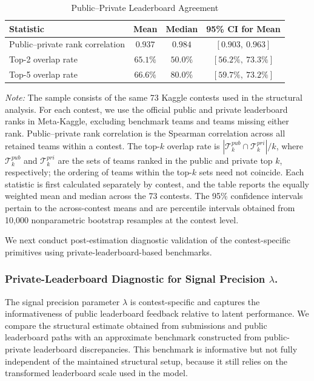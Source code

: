 \documentclass[mnsc]{informs3}
\begin{document}
\begin{table}[H]
\centering
\caption{Public--Private Leaderboard Agreement}
\label{tab-leaderboard-agreement}
\begin{tabularx}{\textwidth}{>{\raggedright\arraybackslash}Xccc}
\toprule
\textbf{Statistic} & \textbf{Mean} & \textbf{Median} & \textbf{95\% CI for Mean} \\
\midrule
Public--private rank correlation & $0.937$ & $0.984$ & $[0.903,\ 0.963]$ \\
Top-2 overlap rate & $65.1\%$ & $50.0\%$ & $[56.2\%,\ 73.3\%]$ \\
Top-5 overlap rate & $66.6\%$ & $80.0\%$ & $[59.7\%,\ 73.2\%]$ \\
\bottomrule
\end{tabularx}
\par\vspace{1.2ex}
\begin{minipage}{\textwidth}
{\footnotesize
\textit{Note:}
The sample consists of the same 73 Kaggle contests used in the structural analysis. For each contest, we use the official public and private leaderboard ranks in Meta-Kaggle, excluding benchmark teams and teams missing either rank. Public--private rank correlation is the Spearman correlation across all retained teams within a contest. The top-$k$ overlap rate is $|\mathcal T^{pub}_{k}\cap\mathcal T^{pri}_{k}|/k$, where $\mathcal T^{pub}_{k}$ and $\mathcal T^{pri}_{k}$ are the sets of teams ranked in the public and private top $k$, respectively; the ordering of teams within the top-$k$ sets need not coincide. Each statistic is first calculated separately by contest, and the table reports the equally weighted mean and median across the 73 contests. The 95\% confidence intervals pertain to the across-contest means and are percentile intervals obtained from 10,000 nonparametric bootstrap resamples at the contest level.
}
\end{minipage}
\end{table}

We next conduct post-estimation diagnostic validation of the contest-specific primitives using private-leaderboard-based benchmarks.

\subsubsection{Private-Leaderboard Diagnostic for Signal Precision $\lambda$.}
The signal precision parameter $\lambda$ is contest-specific and captures the informativeness of public leaderboard feedback relative to latent performance. We compare the structural estimate obtained from submissions and public leaderboard paths with an approximate benchmark constructed from public-private leaderboard discrepancies.
This benchmark is informative but not fully independent of the maintained structural setup, because it still relies on the transformed leaderboard scale used in the model.
\end{document}
